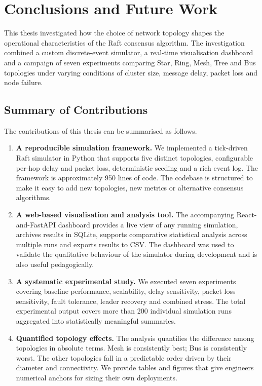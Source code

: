 \chapter{Conclusions and Future Work}
\label{ch:conclusions}

This thesis investigated how the choice of network topology shapes the operational characteristics of the Raft consensus algorithm. The investigation combined a custom discrete-event simulator, a real-time visualisation dashboard and a campaign of seven experiments comparing Star, Ring, Mesh, Tree and Bus topologies under varying conditions of cluster size, message delay, packet loss and node failure.

\section{Summary of Contributions}

The contributions of this thesis can be summarised as follows.

\begin{enumerate}
    \item \textbf{A reproducible simulation framework.} We implemented a tick-driven Raft simulator in Python that supports five distinct topologies, configurable per-hop delay and packet loss, deterministic seeding and a rich event log. The framework is approximately 950 lines of code. The codebase is structured to make it easy to add new topologies, new metrics or alternative consensus algorithms.

    \item \textbf{A web-based visualisation and analysis tool.} The accompanying React-and-FastAPI dashboard provides a live view of any running simulation, archives results in SQLite, supports comparative statistical analysis across multiple runs and exports results to CSV. The dashboard was used to validate the qualitative behaviour of the simulator during development and is also useful pedagogically.

    \item \textbf{A systematic experimental study.} We executed seven experiments covering baseline performance, scalability, delay sensitivity, packet loss sensitivity, fault tolerance, leader recovery and combined stress. The total experimental output covers more than 200 individual simulation runs aggregated into statistically meaningful summaries.

    \item \textbf{Quantified topology effects.} The analysis quantifies the difference among topologies in absolute terms. Mesh is consistently best; Bus is consistently worst. The other topologies fall in a predictable order driven by their diameter and connectivity. We provide tables and figures that give engineers numerical anchors for sizing their own deployments.
\end{enumerate}

